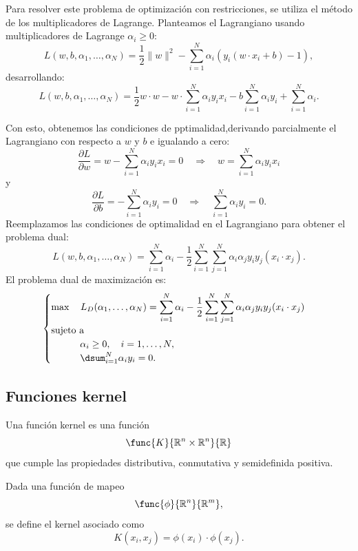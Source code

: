 \documentclass[a4,11pt]{aleph-notas}
\begin{document}
Para resolver este problema de optimización con restricciones, se utiliza el método de los multiplicadores de Lagrange. Planteamos el Lagrangiano usando multiplicadores de Lagrange $\alpha_i \geq 0$:
\[
    L({w}, b, {\alpha_1},\ldots,\alpha_N) = \frac{1}{2} \|{w}\|^2 - \sum_{i=1}^N \alpha_i \left( y_i ({w} \cdot {x}_i + b) - 1 \right),
\]
desarrollando:
\[
    L({w}, b, {\alpha_1},\ldots,\alpha_N) = \frac{1}{2} {w} \cdot {w} - {w} \cdot \sum_{i=1}^N \alpha_i y_i {x}_i - b \sum_{i=1}^N \alpha_i y_i + \sum_{i=1}^N \alpha_i.
\]

Con esto, obtenemos las condiciones de pptimalidad,derivando parcialmente el Lagrangiano con respecto a ${w}$ y $b$ e igualando a cero:
\[
    \frac{\partial L}{\partial {w}} = {w} - \sum_{i=1}^N \alpha_i y_i {x}_i = 0 \quad \Rightarrow \quad {w} = \sum_{i=1}^N \alpha_i y_i {x}_i
\]
y
\[
    \frac{\partial L}{\partial b} = - \sum_{i=1}^N \alpha_i y_i = 0 \quad \Rightarrow \quad \sum_{i=1}^N \alpha_i y_i = 0.
\]
Reemplazamos las condiciones de optimalidad en el Lagrangiano para obtener el problema dual:
\[
    L({w}, b, {\alpha_1},\ldots,\alpha_N) = \sum_{i=1}^N \alpha_i - \frac{1}{2} \sum_{i=1}^N \sum_{j=1}^N \alpha_i \alpha_j y_i y_j ({x}_i \cdot {x}_j).
\]
El problema dual de maximización es:
\[
    \begin{cases}
        \max \quad \displaystyle L_D({\alpha_1},\ldots,\alpha_N) = \sum_{i=1}^N \alpha_i - \frac{1}{2} \sum_{i=1}^N \sum_{j=1}^N \alpha_i \alpha_j y_i y_j ({x}_i \cdot {x}_j) \\
        \text{sujeto a}\\ 
        \qquad\quad \alpha_i \geq 0, \quad i = 1,\ldots, N,\\
        \qquad\quad \dsum_{i=1}^N \alpha_i y_i = 0.
    \end{cases}
\]

\subsection{Funciones kernel}

\begin{defi}
    Una función kernel es una función $$\func{K}{\mathbb{R}^n \times \mathbb{R}^n}{\mathbb{R}}$$ que cumple las propiedades distributiva, conmutativa y semidefinida positiva.
\end{defi}

\begin{advertencia}
    Dada una función de mapeo $$\func{\phi}{\mathbb{R}^n}{\mathbb{R}^m},$$ se define el kernel asociado como $$K({x}_i, {x}_j) = \phi({x}_i) \cdot \phi({x}_j).$$
\end{advertencia}
\end{document}
